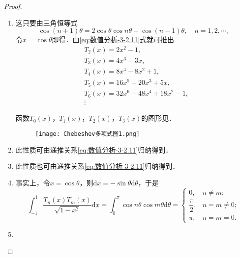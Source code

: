 \documentclass[../../main.tex]{subfiles}
\begin{document}
\begin{proof}
\begin{enumerate}
\item 这只要由三角恒等式
$$\cos(n+1)\theta = 2\cos\theta\cos n\theta - \cos(n-1)\theta,\quad n = 1,2,\cdots,$$
令$x = \cos\theta$即得．由\eqref{eq:数值分析-3-2.11}式就可推出
\begin{align*}
&T_2(x)=2x^2-1,
\\
&T_3(x)=4x^3-3x,
\\
&T_4(x)=8x^4-8x^2+1,
\\
&T_5(x)=16x^5-20x^3+5x,
\\
&T_6(x)=32x^6-48x^4+18x^2-1,
\\
&\vdots 
\end{align*}

函数$T_0(x)$，$T_1(x)$，$T_2(x)$，$T_3(x)$的图形见．
\begin{figure}[H]
\centering
\texttt{[image: Chebeshev多项式图1.png]}
\caption{}
\label{figure:Chebeshev多项式图1}
\end{figure}

\item 此性质可由递推关系\eqref{eq:数值分析-3-2.11}归纳得到．

\item 此性质也可由递推关系\eqref{eq:数值分析-3-2.11}归纳得到．

\item 事实上，令$x = \cos\theta$，则$\mathrm{d}x = -\sin\theta\mathrm{d}\theta$，于是
$$\int_{-1}^1 \frac{T_n(x)T_m(x)}{\sqrt{1 - x^2}}\mathrm{d}x = \int_0^\pi \cos n\theta\cos m\theta\mathrm{d}\theta =
\begin{cases}
0, & n \neq m; \\
\dfrac{\pi}{2}, & n = m \neq 0; \\
\pi, & n = m = 0.
\end{cases}$$

\item 
\end{enumerate}
\end{proof}
\end{document}
